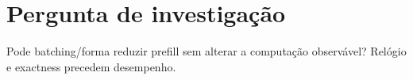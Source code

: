 \section{Pergunta de investigação}
Pode batching/forma reduzir prefill sem alterar a computação observável? Relógio e exactness precedem desempenho.
